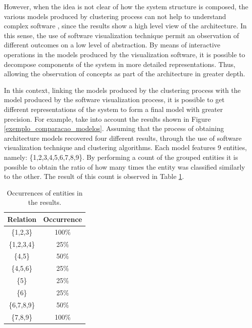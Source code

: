 \documentclass{sig-alternate-05-2015}
\begin{document}
However, when the idea is not clear of how the system structure is composed, the various models produced by clustering process can not help to understand complex software \cite{craft}, since the results show a high level view of the architecture. In this sense, the use of software visualization technique permit an observation of different outcomes on a low level of abstraction. By means of interactive operations in the models produced by the visualization software, it is possible to decompose components of the system in more detailed representations. Thus, allowing the observation of concepts as part of the architecture in greater depth.

In this context, linking the models produced by the clustering process with the model produced by the software visualization process, it is possible to get different representations of the system to form a final model with greater precision. For example, take into account the results shown in Figure \ref{exemplo_comparacao_modelos}. Assuming that the process of obtaining architecture models recovered four different results, through the use of software visualization technique and clustering algorithms. Each model features 9 entities, namely: \{1,2,3,4,5,6,7,8,9\}. By performing a count of the grouped entities it is  possible to obtain the ratio of how many times the entity was classified similarly to the other. The result of this count is observed in Table \ref{ocorrencias_1}.

\begin{table}[]
	\centering
	\caption{Occurrences of entities in the results.}
	\label{ocorrencias_1}
	\begin{tabular}{|cc|}
		\hline
		\multicolumn{1}{|l}{Relation} & \multicolumn{1}{l|}{Occurrence} \\ \hline
		\{1,2,3\}                   & 100\%                           \\
		\{1,2,3,4\}                 & 25\%                            \\
		\{4,5\}                     & 50\%                            \\
		\{4,5,6\}                   & 25\%                            \\
		\{5\}                       & 25\%                            \\
		\{6\}                       & 25\%                            \\
		\{6,7,8,9\}                 & 50\%                            \\
		\{7,8,9\}                   & 100\%                           \\ \hline
	\end{tabular}
\end{table}
\end{document}
